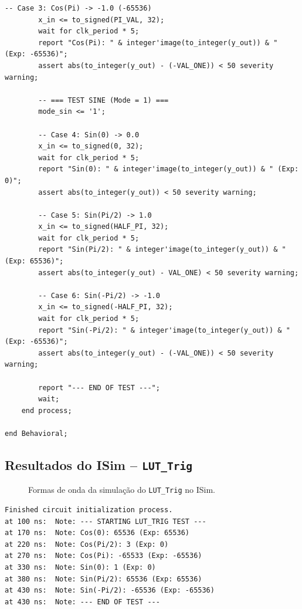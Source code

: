 \documentclass[a4paper,12pt]{article}
\begin{document}
\begin{lstlisting}[style=vhdlstyle,
    caption={Testbench do \texttt{LUT\_Trig}.},
    label={lst:lut_trig_tb}]
        -- Case 3: Cos(Pi) -> -1.0 (-65536)
        x_in <= to_signed(PI_VAL, 32);
        wait for clk_period * 5;
        report "Cos(Pi): " & integer'image(to_integer(y_out)) & " (Exp: -65536)";
        assert abs(to_integer(y_out) - (-VAL_ONE)) < 50 severity warning;

        -- === TEST SINE (Mode = 1) ===
        mode_sin <= '1';

        -- Case 4: Sin(0) -> 0.0
        x_in <= to_signed(0, 32);
        wait for clk_period * 5;
        report "Sin(0): " & integer'image(to_integer(y_out)) & " (Exp: 0)";
        assert abs(to_integer(y_out)) < 50 severity warning;

        -- Case 5: Sin(Pi/2) -> 1.0
        x_in <= to_signed(HALF_PI, 32);
        wait for clk_period * 5;
        report "Sin(Pi/2): " & integer'image(to_integer(y_out)) & " (Exp: 65536)";
        assert abs(to_integer(y_out) - VAL_ONE) < 50 severity warning;

        -- Case 6: Sin(-Pi/2) -> -1.0
        x_in <= to_signed(-HALF_PI, 32);
        wait for clk_period * 5;
        report "Sin(-Pi/2): " & integer'image(to_integer(y_out)) & " (Exp: -65536)";
        assert abs(to_integer(y_out) - (-VAL_ONE)) < 50 severity warning;

        report "--- END OF TEST ---";
        wait;
    end process;

end Behavioral;
\end{lstlisting}

\subsection{Resultados do ISim -- \texttt{LUT\_Trig}}

\begin{figure}[H]
\centering
{}
\caption{Formas de onda da simula\c{c}\~ao do \texttt{LUT\_Trig} no ISim.}
\label{fig:wave_lut}
\end{figure}

\begin{lstlisting}[style=logstyle,
    caption={Log de sa\'ida do ISim -- \texttt{LUT\_Trig}.},
    label={lst:log_lut}]
Finished circuit initialization process.
at 100 ns:  Note: --- STARTING LUT_TRIG TEST ---
at 170 ns:  Note: Cos(0): 65536 (Exp: 65536)
at 220 ns:  Note: Cos(Pi/2): 3 (Exp: 0)
at 270 ns:  Note: Cos(Pi): -65533 (Exp: -65536)
at 330 ns:  Note: Sin(0): 1 (Exp: 0)
at 380 ns:  Note: Sin(Pi/2): 65536 (Exp: 65536)
at 430 ns:  Note: Sin(-Pi/2): -65536 (Exp: -65536)
at 430 ns:  Note: --- END OF TEST ---
\end{lstlisting}
\end{document}
